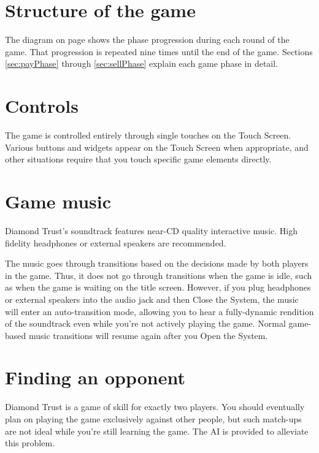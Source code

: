 \documentclass[8pt]{extbook}
\begin{document}
\section{Structure of the game}

The diagram on page \pageref{fig:gameFlow} shows the phase progression during each round of the game.  That progression is repeated nine times until the end of the game.  Sections \ref{sec:payPhase} through \ref{sec:sellPhase} explain each game phase in detail.











\section{Controls}
The game is controlled entirely through single touches on the Touch Screen.  Various buttons and widgets appear on the Touch Screen when appropriate, and other situations require that you touch specific game elements directly.

\section{Game music}

Diamond Trust's soundtrack features near-CD quality interactive music.  High fidelity headphones or external speakers are recommended.  

The music goes through transitions based on the decisions made by both players in the game.  Thus, it does not go through transitions when the game is idle, such as when the game is waiting on the title screen.  However, if you plug headphones or external speakers into the audio jack and then Close the System, the music will enter an auto-transition mode, allowing you to hear a fully-dynamic rendition of the soundtrack even while you're not actively playing the game.  Normal game-based music transitions will resume again after you Open the System.

\section{Finding an opponent}

Diamond Trust is a game of skill for exactly two players.  You should eventually plan on playing the game exclusively against other people, but such match-ups are not ideal while you're still learning the game.  The AI is provided to alleviate this problem.
\end{document}
